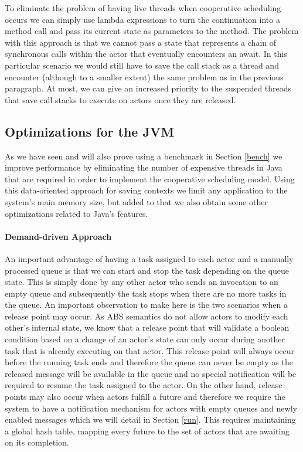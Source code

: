 To eliminate the problem of having live threads when cooperative scheduling occurs we can simply use lambda expressions to turn the continuation into a method call and pass its current state as parameters to the method. The problem with this approach is that we cannot pass a state that represents a chain of synchronous calls within the actor that eventually encounters an await. In this particular scenario we would still have to save the call stack as a thread and encounter (although to a smaller extent) the same problem as in the previous paragraph. At most, we can give an increased priority to the suspended threads that save call stacks to execute on actors once they are released.



\subsection{Optimizations for the JVM}
As we have seen and will also prove using a benchmark in Section \ref{bench} we improve performance by eliminating the number of expensive threads in Java that are required in order to implement the cooperative scheduling model. Using this data-oriented approach for saving contexts we limit any application to the system's main memory size, but added to that we also obtain some other optimizations related to Java's features.

\paragraph{Demand-driven Approach}
An important advantage of having a task assigned to each actor and a manually processed queue is that we can start and stop the task depending on the queue state. This is simply done by any other actor who sends an invocation to an empty queue and subsequently the task stops when there are no more tasks in the queue. An important observation to make here is the two scenarios when a release point may occur. As ABS semantics do not allow actors to modify each other's internal state, we know that a release point that will validate a boolean condition based on a change of an actor's state can only occur during another task that is already executing on that actor. This release point will always occur before the running task ends and therefore the queue can never be empty as the released message will be available in the queue and no special notification will be required to resume the task assigned to the actor. On the other hand, release points may also occur when actors fulfill a future and therefore we require the system to have a notification mechanism for actors with empty queues and newly enabled messages which we will detail in Section \ref{run}. This requires maintaining a global hash table, mapping every future to the set of actors that are awaiting on its completion.

